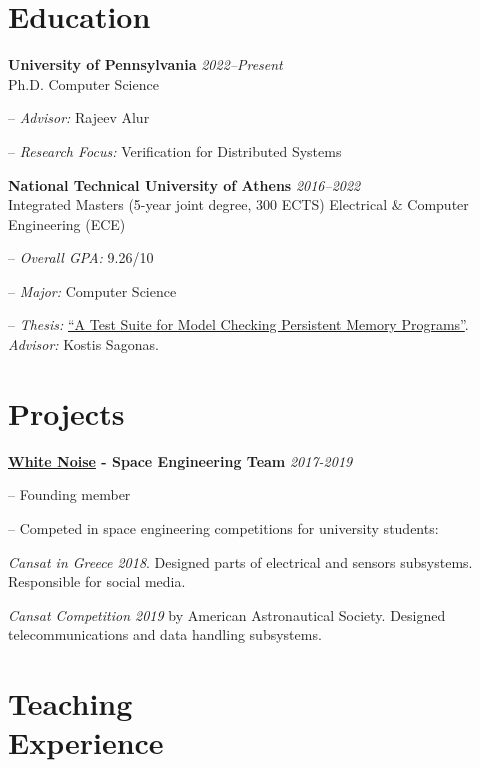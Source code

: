 \documentclass[margin]{res}
\newcommand{\field}[2]{\noindent \textbf{#1} \hfill #2 \\}
\begin{document}
\begin{resume}


\section{Education}

\field{University of Pennsylvania}  {\emph{2022--Present}} 
Ph.D. Computer Science
\begin{compactitem}
\item[--] \emph{Advisor:} Rajeev Alur
\item[--] \emph{Research Focus:} Verification for Distributed Systems
\end{compactitem}
 
\field{National Technical University of Athens}  {\emph{2016--2022}} 
Integrated Masters (5-year joint degree, 300 ECTS) Electrical \& Computer Engineering (ECE)
\begin{compactitem}
\item[--] \emph{Overall GPA:} 9.26/10 
\item[--] \emph{Major:} Computer Science 
\item[--] \emph{Thesis:} \href{http://artemis.cslab.ece.ntua.gr:8080/jspui/bitstream/123456789/18415/1/thesis.pdf}{``A Test Suite for Model Checking Persistent Memory Programs''}. \emph{Advisor:} Kostis Sagonas.
\end{compactitem} 

\section{Projects}

\textbf{\href{https://whitenoise.gr/}{White Noise} - Space Engineering Team} \hfill \emph{2017-2019}
\begin{compactitem}
\item[--] Founding member
\item[--] Competed in space engineering competitions for university students:
\begin{compactitem}
\item \textit{Cansat in Greece 2018}. Designed parts of electrical and sensors subsystems. Responsible for social media.
\item \textit{Cansat Competition 2019} by American Astronautical Society. Designed telecommunications and data handling subsystems.
\end{compactitem}
\end{compactitem}

\section{Teaching \\ Experience}


\end{resume}
\end{document}
